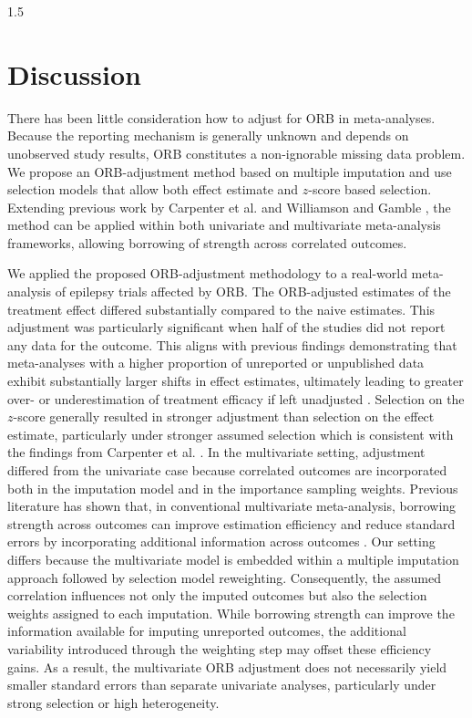 \documentclass{article}
\begin{document}
\begin{spacing}{1.5}
\section{Discussion}
\label{discussion}

There has been little consideration how to adjust for ORB in meta-analyses. Because the reporting mechanism is generally unknown and depends on unobserved study results, ORB constitutes a non-ignorable missing data problem. We propose an ORB-adjustment method based on multiple imputation and use selection models that allow both effect estimate and $z$-score based selection. Extending previous work by Carpenter et al. \cite{carpenter2011assessing} and Williamson and Gamble \cite{williamson2005identification}, the method can be applied within both univariate and multivariate meta-analysis frameworks, allowing borrowing of strength across correlated outcomes.

We applied the proposed ORB-adjustment methodology to a real-world meta-analysis of epilepsy trials \cite{pulman2014topiramate, bresnahan2019topiramate} affected by ORB. The ORB-adjusted estimates of the treatment effect differed substantially compared to the naive estimates. This adjustment was particularly significant when half of the studies did not report any data for the outcome. This aligns with previous findings demonstrating that meta-analyses with a higher proportion of unreported or unpublished data exhibit substantially larger shifts in effect estimates, ultimately leading to greater over- or underestimation of treatment efficacy if left unadjusted \cite{saracini2025addressing, hart2012effect}. Selection on the $z$-score generally resulted in stronger adjustment than selection on the effect estimate, particularly under stronger assumed selection which is consistent with the findings from Carpenter et al. \cite{carpenter2007sensitivity}. In the multivariate setting, adjustment differed from the univariate case because correlated outcomes are incorporated both in the imputation model and in the importance sampling weights. Previous literature has shown that, in conventional multivariate meta-analysis, borrowing strength across outcomes can improve estimation efficiency and reduce standard errors by incorporating additional information across outcomes \cite{jackson2011multivariate, riley2007evaluation}. Our setting differs because the multivariate model is embedded within a multiple imputation approach followed by selection model reweighting. Consequently, the assumed correlation influences not only the imputed outcomes but also the selection weights assigned to each imputation. While borrowing strength can improve the information available for imputing unreported outcomes, the additional variability introduced through the weighting step may offset these efficiency gains. As a result, the multivariate ORB adjustment does not necessarily yield smaller standard errors than separate univariate analyses, particularly under strong selection or high heterogeneity.


\end{spacing}
\end{document}
